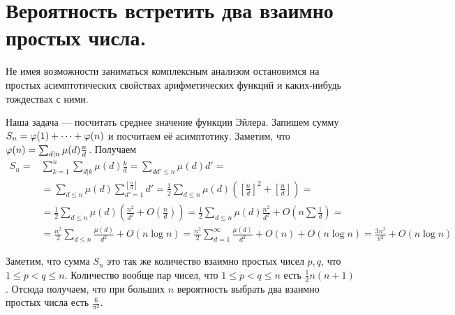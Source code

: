 \section{
 Вероятность встретить два взаимно простых числа.
}

Не имея возможности заниматься комплексным анализом остановимся на простых асимптотических свойствах арифметических функций и каких-нибудь тождествах с ними.

Наша задача --- посчитать среднее значение функции Эйлера. Запишем сумму $S_n=\varphi(1)+\dots+\varphi(n)$ и посчитаем её асимптотику. Заметим, что $\varphi(n)=\sum_{d|n}\mu(d)\frac{n}{d}$. Получаем 
$$\begin{aligned}
S_n=&\sum_{k=1}^n\sum_{d|k}\mu(d)\frac{k}{d}=\sum_{dd'\leq n} \mu(d)d'=\\
&=\sum_{d\leq n}\mu(d)\sum_{d'=1}^{[\frac{n}{d}]} d'=\frac{1}{2}\sum_{d\leq n}\mu(d)\left(\left[\frac{n}{d}\right]^2+\left[\frac{n}{d}\right]\right)=\\
&=\frac{1}{2}\sum_{d\leq n}\mu(d)\left(\frac{n^2}{d^2}+O\left(\frac{n}{d}\right)\right)=\frac{1}{2}\sum_{d\leq n}\mu(d)\frac{n^2}{d^2}+O\left(n\sum \frac{1}{d}\right)=\\
&=\frac{n^2}{2}\sum_{d\leq n}\frac{\mu(d)}{d^2}+O\left(n\log n\right)=\frac{n^2}{2}\sum_{d=1}^{\infty}\frac{\mu(d)}{d^2}+O(n)+O(n\log n)= \frac{3n^2}{\pi^2}+O(n\log n)
\end{aligned}$$

Заметим, что сумма $S_n$ это так же количество взаимно простых чисел $p,q$, что $1\leq p<q\leq n$. Количество вообще пар чисел, что  $1\leq p<q\leq n$ есть $\frac{1}{2}n(n+1)$. Отсюда получаем, что при больших $n$ вероятность выбрать два взаимно простых числа есть $\frac{6}{\pi^2}$.

